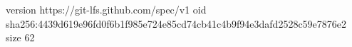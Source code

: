 version https://git-lfs.github.com/spec/v1
oid sha256:4439d619e96fd0f6b1f985e724e85cd74cb41c4b9f94e3dafd2528c59e7876e2
size 62
